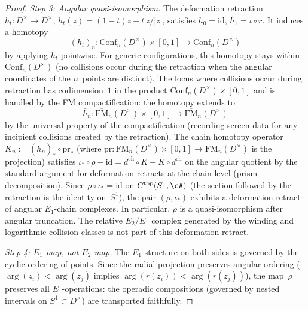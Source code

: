 \begin{proof}
\medskip
\noindent\textit{Step 3: Angular quasi-isomorphism.}
The deformation retraction
$h_t\colon D^\times\to D^\times$,
$h_t(z)=(1-t)z+t\,z/|z|$, satisfies $h_0=\mathrm{id}$,
$h_1=\iota\circ r$. It induces a homotopy
\[
 (h_t)_n\colon
 \mathrm{Conf}_n(D^\times)\times[0,1]
 \longrightarrow\mathrm{Conf}_n(D^\times)
\]
by applying $h_t$ pointwise. For generic configurations,
this homotopy stays within
$\mathrm{Conf}_n(D^\times)$ (no collisions occur
during the retraction when the angular coordinates of
the $n$~points are distinct).
The locus where collisions occur during retraction has
codimension~$1$ in the product
$\mathrm{Conf}_n(D^\times)\times[0,1]$
and is handled by the FM compactification: the homotopy
extends to
\[
 \bar h_n\colon
 \overline{\mathrm{FM}}_n(D^\times)\times[0,1]
 \longrightarrow
 \overline{\mathrm{FM}}_n(D^\times)
\]
by the universal property of the compactification
(recording screen data for any incipient collisions
created by the retraction).
The chain homotopy operator
$K_n:=(\bar h_n)_\ast\circ\mathrm{pr}_\ast$
(where $\mathrm{pr}\colon
\overline{\mathrm{FM}}_n(D^\times)\times[0,1]
\to\overline{\mathrm{FM}}_n(D^\times)$ is the
projection) satisfies
$\iota_\ast\circ\rho - \mathrm{id}
= d^{\mathrm{ch}}\circ K + K\circ d^{\mathrm{ch}}$
on the angular quotient by the standard argument for deformation
retracts at the chain level (prism decomposition). Since
$\rho\circ\iota_\ast=\mathrm{id}$ on
$C^{\mathrm{top}}(S^1,\cA)$
(the section followed by the retraction is the identity
on~$S^1$), the pair $(\rho,\iota_\ast)$ exhibits a
deformation retract of angular \(E_1\)-chain complexes.
In particular, $\rho$ is a quasi-isomorphism after angular
truncation. The relative \(E_2/E_1\) complex generated by the
winding and logarithmic collision classes is not part of this
deformation retract.

\medskip
\noindent\textit{Step 4: $E_1$-map, not $E_2$-map.}
The $E_1$-structure on both sides is governed by the
cyclic ordering of points.
Since the radial projection preserves angular ordering
($\arg(z_i)<\arg(z_j)$ implies
$\arg(r(z_i))<\arg(r(z_j))$), the map~$\rho$ preserves
all $E_1$-operations: the operadic compositions
(governed by nested intervals on $S^1\subset D^\times$)
are transported faithfully.


\end{proof}
